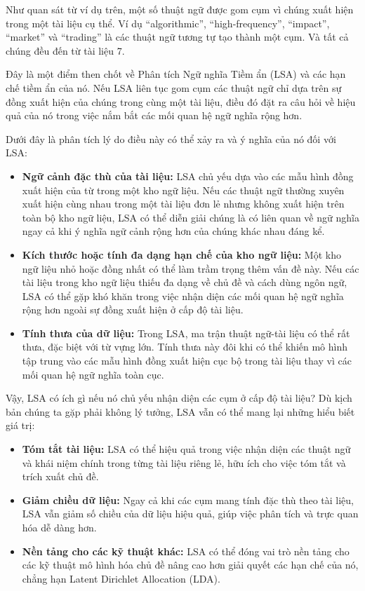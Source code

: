 Như quan sát từ ví dụ trên, một số thuật ngữ được gom cụm vì chúng xuất hiện trong một tài liệu cụ thể. Ví dụ ``algorithmic'', ``high-frequency'', ``impact'', ``market'' và ``trading'' là các thuật ngữ tương tự tạo thành một cụm. Và tất cả chúng đều đến từ tài liệu 7.

Đây là một điểm then chốt về Phân tích Ngữ nghĩa Tiềm ẩn (LSA) và các hạn chế tiềm ẩn của nó. Nếu LSA liên tục gom cụm các thuật ngữ chỉ dựa trên sự đồng xuất hiện của chúng trong cùng một tài liệu, điều đó đặt ra câu hỏi về hiệu quả của nó trong việc nắm bắt các mối quan hệ ngữ nghĩa rộng hơn.

Dưới đây là phân tích lý do điều này có thể xảy ra và ý nghĩa của nó đối với LSA:

\begin{itemize}
  \item \textbf{Ngữ cảnh đặc thù của tài liệu:} LSA chủ yếu dựa vào các mẫu hình đồng xuất hiện của từ trong một kho ngữ liệu. Nếu các thuật ngữ thường xuyên xuất hiện cùng nhau trong một tài liệu đơn lẻ nhưng không xuất hiện trên toàn bộ kho ngữ liệu, LSA có thể diễn giải chúng là có liên quan về ngữ nghĩa ngay cả khi ý nghĩa ngữ cảnh rộng hơn của chúng khác nhau đáng kể.
  \item \textbf{Kích thước hoặc tính đa dạng hạn chế của kho ngữ liệu:} Một kho ngữ liệu nhỏ hoặc đồng nhất có thể làm trầm trọng thêm vấn đề này. Nếu các tài liệu trong kho ngữ liệu thiếu đa dạng về chủ đề và cách dùng ngôn ngữ, LSA có thể gặp khó khăn trong việc nhận diện các mối quan hệ ngữ nghĩa rộng hơn ngoài sự đồng xuất hiện ở cấp độ tài liệu.
  \item \textbf{Tính thưa của dữ liệu:} Trong LSA, ma trận thuật ngữ-tài liệu có thể rất thưa, đặc biệt với từ vựng lớn. Tính thưa này đôi khi có thể khiến mô hình tập trung vào các mẫu hình đồng xuất hiện cục bộ trong tài liệu thay vì các mối quan hệ ngữ nghĩa toàn cục.
\end{itemize}

Vậy, LSA có ích gì nếu nó chủ yếu nhận diện các cụm ở cấp độ tài liệu? Dù kịch bản chúng ta gặp phải không lý tưởng, LSA vẫn có thể mang lại những hiểu biết giá trị:

\begin{itemize}
  \item \textbf{Tóm tắt tài liệu:} LSA có thể hiệu quả trong việc nhận diện các thuật ngữ và khái niệm chính trong từng tài liệu riêng lẻ, hữu ích cho việc tóm tắt và trích xuất chủ đề.
  \item \textbf{Giảm chiều dữ liệu:} Ngay cả khi các cụm mang tính đặc thù theo tài liệu, LSA vẫn giảm số chiều của dữ liệu hiệu quả, giúp việc phân tích và trực quan hóa dễ dàng hơn.
  \item \textbf{Nền tảng cho các kỹ thuật khác:} LSA có thể đóng vai trò nền tảng cho các kỹ thuật mô hình hóa chủ đề nâng cao hơn giải quyết các hạn chế của nó, chẳng hạn Latent Dirichlet Allocation (LDA).
\end{itemize}

